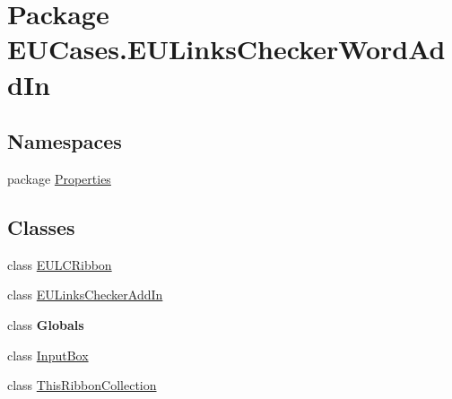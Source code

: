 \hypertarget{namespace_e_u_cases_1_1_e_u_links_checker_word_add_in}{\section{Package E\+U\+Cases.\+E\+U\+Links\+Checker\+Word\+Add\+In}
\label{namespace_e_u_cases_1_1_e_u_links_checker_word_add_in}
}
\subsection*{Namespaces}
\begin{DoxyCompactItemize}
\item 
package \hyperlink{namespace_e_u_cases_1_1_e_u_links_checker_word_add_in_1_1_properties}{Properties}
\end{DoxyCompactItemize}
\subsection*{Classes}
\begin{DoxyCompactItemize}
\item 
class \hyperlink{class_e_u_cases_1_1_e_u_links_checker_word_add_in_1_1_e_u_l_c_ribbon}{E\+U\+L\+C\+Ribbon}
\item 
class \hyperlink{class_e_u_cases_1_1_e_u_links_checker_word_add_in_1_1_e_u_links_checker_add_in}{E\+U\+Links\+Checker\+Add\+In}
\item 
class {\bfseries Globals}
\item 
class \hyperlink{class_e_u_cases_1_1_e_u_links_checker_word_add_in_1_1_input_box}{Input\+Box}
\item 
class \hyperlink{class_e_u_cases_1_1_e_u_links_checker_word_add_in_1_1_this_ribbon_collection}{This\+Ribbon\+Collection}
\end{DoxyCompactItemize}
